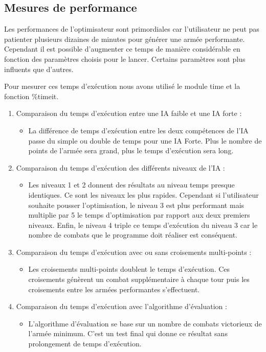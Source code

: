 \documentclass[a4paper]{article} %
\begin{document}
	\subsection{Mesures de performance}\label{performances}
	Les performances de l'optimisateur sont primordiales car l'utilisateur ne peut pas patienter plusieurs dizaines de minutes pour générer une armée performante. Cependant il est possible d'augmenter ce temps de manière considérable en fonction des paramètres choisis pour le lancer. Certains paramètres sont plus influents que d'autres.
	
Pour mesurer ces temps d'exécution nous avons utilisé le module time et la fonction \%timeit.
\begin{enumerate}
\item Comparaison du temps d'exécution entre une IA faible et une IA forte : 
	\begin{itemize}
	\item La différence de temps d'exécution entre les deux compétences de l'IA passe du simple ou double de temps pour une IA Forte. Plus le nombre de points de l'armée sera grand, plus le temps d'exécution sera long.
	\end{itemize}

\item Comparaison du temps d'exécution des différents niveaux de l'IA : 
	\begin{itemize}
	\item Les niveaux 1 et 2 donnent des résultats au niveau temps presque identiques. Ce sont les niveaux les plus rapides. Cependant si l'utilisateur souhaite pousser l'optimisation, le niveau 3 est plus performant mais multiplie par 5 le temps d'optimisation par rapport aux deux premiers niveaux. Enfin, le niveau 4 triple ce temps d'exécution du niveau 3 car le nombre de combats que le programme doit réaliser est conséquent.
	\end{itemize}

\item Comparaison du temps d'exécution avec ou sans croisements multi-points : 
	\begin{itemize}
	\item Les croisements multi-points doublent le temps d'exécution. Ces croisements génèrent un combat supplémentaire à chaque tour puis les croisements entre les armées performantes s'effectuent.
	\end{itemize}

\item Comparaison du temps d'exécution avec l'algorithme d'évaluation : 
	\begin{itemize}
	\item L'algorithme d'évaluation se base sur un nombre de combats victorieux de l'armée minimum. C'est un test final qui donne ce résultat sans prolongement de temps d'exécution.
	\end{itemize}
\end{enumerate}
\end{document}
